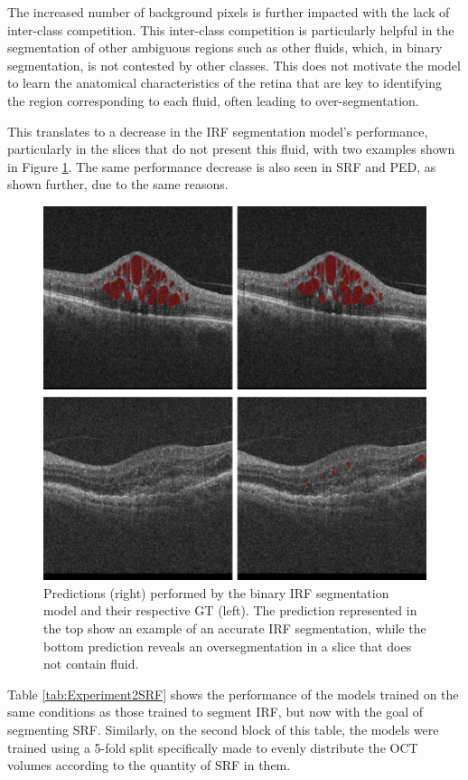\par
The increased number of background pixels is further impacted with the lack of inter-class competition. This inter-class competition is particularly helpful in the segmentation of other ambiguous regions such as other fluids, which, in binary segmentation, is not contested by other classes. This does not motivate the model to learn the anatomical characteristics of the retina that are key to identifying the region corresponding to each fluid, often leading to over-segmentation. 
\par
This translates to a decrease in the IRF segmentation model's performance, particularly in the slices that do not present this fluid, with two examples shown in Figure \ref{fig:Experiment2IRFSegmentation}. The same performance decrease is also seen in SRF and PED, as shown further, due to the same reasons.

\begin{figure}[!ht]
	\centering
	\includegraphics[width=0.7\linewidth]{figures/Experiment2IRFSegmentation.png}
	\caption{Predictions (right) performed by the binary IRF segmentation model and their respective GT (left). The prediction represented in the top show an example of an accurate IRF segmentation, while the bottom prediction reveals an oversegmentation in a slice that does not contain fluid.}
	\label{fig:Experiment2IRFSegmentation}
\end{figure}

Table \ref{tab:Experiment2SRF} shows the performance of the models trained on the same conditions as those trained to segment IRF, but now with the goal of segmenting SRF. Similarly, on the second block of this table, the models were trained using a 5-fold split specifically made to evenly distribute the OCT volumes according to the quantity of SRF in them.

